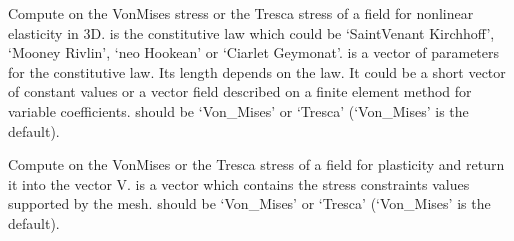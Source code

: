 \documentclass[a4paper,11pt,english]{sphinxmanual}
\begin{document}
\begin{fulllineitems}
\begin{fulllineitems}
\label{\detokenize{python/cmdref_Model:getfem.Model.compute_Von_Mises_or_Tresca}}
Compute on  the Von\sphinxhyphen{}Mises stress or the Tresca stress of a field
for nonlinear elasticity in 3D.  is the constitutive law which
could be ‘SaintVenant Kirchhoff’, ‘Mooney Rivlin’, ‘neo Hookean’ or
‘Ciarlet Geymonat’.
 is a vector of parameters for the constitutive law. Its length
depends on the law. It could be a short vector of constant values or a
vector field described on a finite element method for variable coefficients.
 should be  ‘Von\_Mises’ or ‘Tresca’ (‘Von\_Mises’ is the default).

\end{fulllineitems}


\begin{fulllineitems}
\label{\detokenize{python/cmdref_Model:getfem.Model.compute_elastoplasticity_Von_Mises_or_Tresca}}
Compute on  the Von\sphinxhyphen{}Mises or the Tresca stress of a field for plasticity and return it into the vector V.
 is a vector which contains the stress constraints values supported by the mesh.
 should be  ‘Von\_Mises’ or ‘Tresca’ (‘Von\_Mises’ is the default).

\end{fulllineitems}



\end{fulllineitems}
\end{document}
